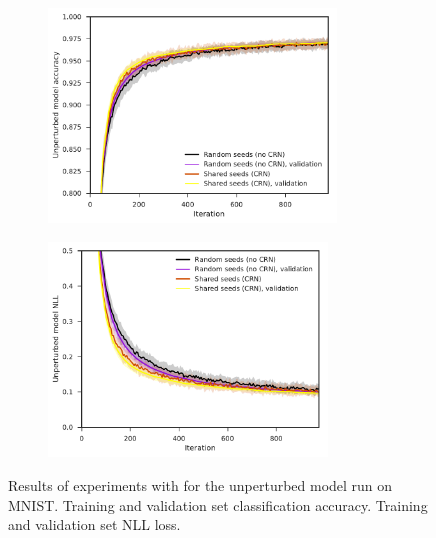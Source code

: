 \begin{figure}[tbp!]
    \begin{subfigure}[b]{0.49\textwidth}
        \centering
        \includegraphics[height=5.7cm]{graphics/E027-CRN-S-analysis/accuracy_unp-all-series-mean-sd.pdf}
        \caption{}
        \label{fig: Theory: E027-CRN-S-analysis/accuracy_unp-all-series-mean-sd}
    \end{subfigure}
    \hfill
    \begin{subfigure}[b]{0.49\textwidth}
        \centering
        \includegraphics[height=5.7cm]{graphics/E027-CRN-S-analysis/return_unp-all-series-mean-sd.pdf}
        \caption{}
        \label{fig: Theory: E027-CRN-S-analysis/return_unp-all-series-mean-sd}
    \end{subfigure}
    \caption{
        Results of experiments with  for the unperturbed model run on \gls{MNIST}.
         Training and validation set classification accuracy.
         Training and validation set \gls{NLL} loss.
    }
    \label{fig: Theory: E027-CRN-S-analysis}
\end{figure}
